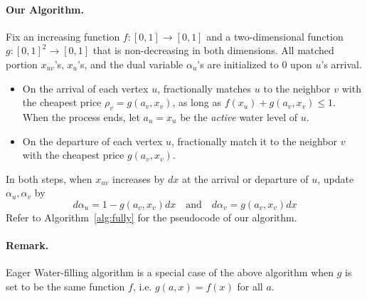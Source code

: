 \paragraph{Our Algorithm.} Fix an increasing function $f:[0,1] \to [0,1]$ and a two-dimensional function $g:[0,1]^2 \to [0,1]$ that is non-decreasing in both dimensions. 
All matched portion $x_{uv}$'s, $x_u$'s, and the dual variable $\alpha_u$'s  are initialized to $0$ upon $u$'s arrival. 
\begin{itemize}
	\item On the arrival of each vertex $u$, fractionally matches $u$ to the neighbor $v$ with the cheapest price $\rho_v = g(a_v, x_v)$, as long as $f(x_u) + g(a_v, x_v) \le 1$. When the process ends, let $a_u = x_u$ be the \emph{active} water level of $u$.%
	\item On the departure of each vertex $u$, fractionally match it to the neighbor $v$ with the cheapest price $g(a_v, x_v)$.
\end{itemize}

In both steps, when $x_{uv}$ increases by $dx$ at the arrival or departure of $u$, update $\alpha_u, \alpha_v$ by 
\[
d\alpha_u = 1-g(a_v,x_v) dx \quad \text{and} \quad d\alpha_v = g(a_v, x_v) dx
\]
Refer to Algorithm~\ref{alg:fully} for the pseudocode of our algorithm.
\paragraph{Remark.} Eager Water-filling algorithm is a special case of the above algorithm when $g$ is set to be the same function $f$, i.e. $g(a, x) = f(x)$ for all $a$.

